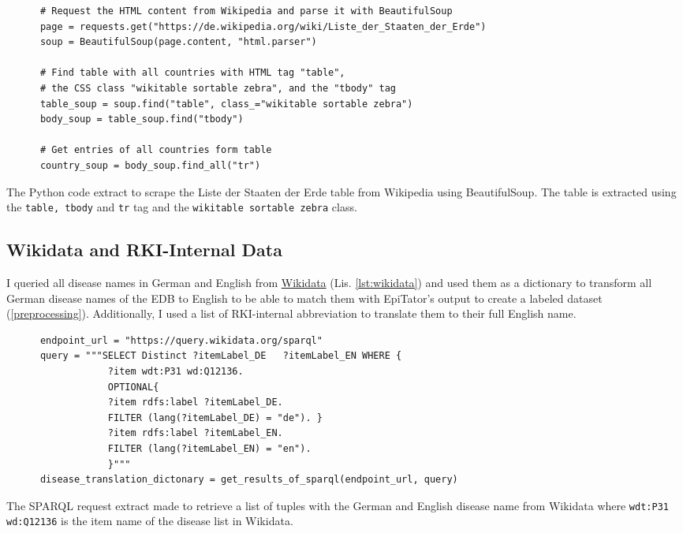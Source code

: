   \begin{listing}[h]
    \begin{verbatim}
      # Request the HTML content from Wikipedia and parse it with BeautifulSoup
      page = requests.get("https://de.wikipedia.org/wiki/Liste_der_Staaten_der_Erde")
      soup = BeautifulSoup(page.content, "html.parser")

      # Find table with all countries with HTML tag "table",
      # the CSS class "wikitable sortable zebra", and the "tbody" tag
      table_soup = soup.find("table", class_="wikitable sortable zebra")
      body_soup = table_soup.find("tbody")

      # Get entries of all countries form table
      country_soup = body_soup.find_all("tr")
    \end{verbatim}
    \caption{The Python code extract to scrape the Liste der Staaten der Erde table from Wikipedia using BeautifulSoup. The table is extracted using the \texttt{table, tbody} and \texttt{tr} tag and the \texttt{wikitable sortable zebra} class.}
    \label{lst:wikipedia}
  \end{listing}

\subsection{Wikidata and RKI-Internal Data}\label{wikidata}
  I queried all disease names in German and English from \href{https://www.wikidata.org/wiki/Wikidata:Main_Page}{Wikidata} (Lis. \ref{lst:wikidata}) and used them as a dictionary to transform all German disease names of the EDB to English to be able to match them with EpiTator's output to create a labeled dataset (\ref{preprocessing}).
  Additionally, I used a list of RKI-internal abbreviation to translate them to their full English name.

  \begin{listing}[h]
    \begin{verbatim}
      endpoint_url = "https://query.wikidata.org/sparql"
      query = """SELECT Distinct ?itemLabel_DE   ?itemLabel_EN WHERE {
                  ?item wdt:P31 wd:Q12136.
                  OPTIONAL{
                  ?item rdfs:label ?itemLabel_DE.
                  FILTER (lang(?itemLabel_DE) = "de"). }
                  ?item rdfs:label ?itemLabel_EN.
                  FILTER (lang(?itemLabel_EN) = "en").
                  }"""
      disease_translation_dictonary = get_results_of_sparql(endpoint_url, query)
    \end{verbatim}
    \caption{The SPARQL request extract made to retrieve a list of tuples with the German and English disease name from Wikidata where \texttt{wdt:P31 wd:Q12136} is the item name of the disease list in Wikidata.}
    \label{lst:wikidata}
  \end{listing}

